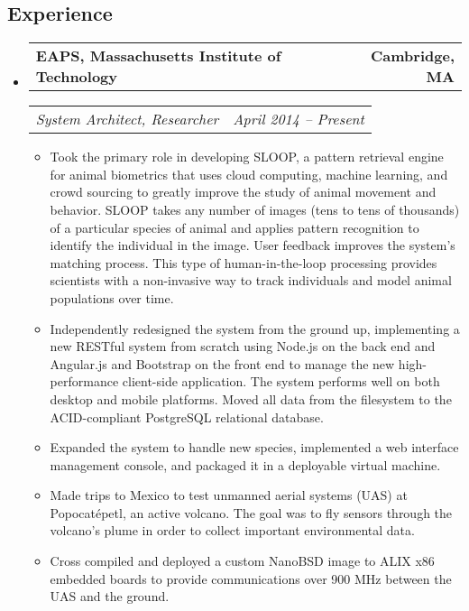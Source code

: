 \documentclass[10pt,letterpaper]{article}
\makeatletter
\newcommand{\headerrow}[2]
{\begin{tabular*}{\linewidth}{l@{\extracolsep{\fill}}r}
	#1 & #2 \\
\end{tabular*}}
\makeatother
\begin{document}
\subsection*{Experience}
\begin{itemize}
	\parskip=0.1em
    \item
    \headerrow
        {\textbf{EAPS, Massachusetts Institute of Technology}}
        {\textbf{Cambridge, MA}}
    \headerrow
        {\emph{System Architect, Researcher}}
        {\emph{April 2014 -- Present}}
    \begin{itemize}
        \item Took the primary role in developing SLOOP, a pattern retrieval
            engine for animal biometrics that uses cloud computing, machine
            learning, and crowd sourcing to greatly improve the study of animal
            movement and behavior.  SLOOP takes any number of images (tens to
            tens of thousands) of a particular species of animal and applies
            pattern recognition to identify the individual in the image.  User
            feedback improves the system's matching process.  This type of
            human-in-the-loop processing provides scientists with a
            non-invasive way to track individuals and model animal populations
            over time.

        \item Independently redesigned the system from the ground up,
            implementing a new RESTful system from scratch using Node.js on the
            back end and Angular.js and Bootstrap on the front end to manage
            the new high-performance client-side application.  The system
            performs well on both desktop and mobile platforms.  Moved all data
            from the filesystem to the ACID-compliant PostgreSQL relational
            database.

        \item Expanded the system to handle new species, implemented a web
            interface management console, and packaged it in a deployable
            virtual machine.

        \item Made trips to Mexico to test unmanned aerial systems (UAS) at
            Popocatépetl, an active volcano. The goal was to fly sensors
            through the volcano's plume in order to collect important
            environmental data.

        \item Cross compiled and deployed a custom NanoBSD image to ALIX x86
            embedded boards to provide communications over 900 MHz between the
            UAS and the ground.


\end{itemize}
\end{itemize}
\end{document}
